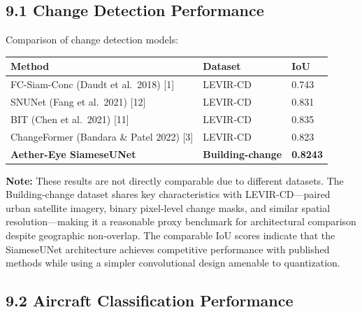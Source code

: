 \documentclass[11pt,a4paper]{article}
\begin{document}
\hypertarget{change-detection-performance}{%
\subsection{9.1 Change Detection Performance}\label{change-detection-performance}}
 
Comparison of change detection models:
 
\begin{longtable}[]{@{}lll@{}}
\toprule\noalign{}
Method & Dataset & IoU \\
\midrule\noalign{}
\endhead
\bottomrule\noalign{}
\endlastfoot
FC-Siam-Conc (Daudt et al.\ 2018) [1] & LEVIR-CD & 0.743 \\
SNUNet (Fang et al.\ 2021) [12] & LEVIR-CD & 0.831 \\
BIT (Chen et al.\ 2021) [11] & LEVIR-CD & 0.835 \\
ChangeFormer (Bandara \& Patel 2022) [3] & LEVIR-CD & 0.823 \\
\textbf{Aether-Eye SiameseUNet} & \textbf{Building-change} & \textbf{0.8243} \\
\end{longtable}
 
\textbf{Note:} These results are not directly comparable due to different datasets. The Building-change dataset shares key characteristics with LEVIR-CD---paired urban satellite imagery, binary pixel-level change masks, and similar spatial resolution---making it a reasonable proxy benchmark for architectural comparison despite geographic non-overlap. The comparable IoU scores indicate that the SiameseUNet architecture achieves competitive performance with published methods while using a simpler convolutional design amenable to quantization.
 
\hypertarget{aircraft-classification-performance}{%
\subsection{9.2 Aircraft Classification Performance}\label{aircraft-classification-performance}}
 
\end{document}
